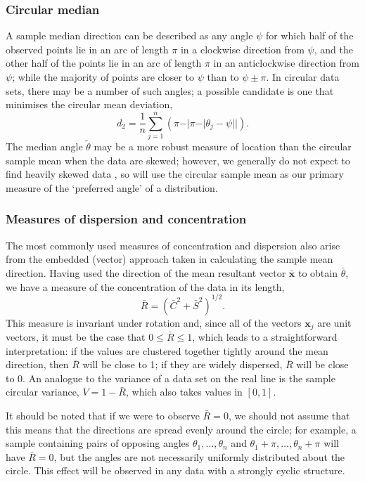 \documentclass[../../ArchStats.tex]{subfiles}
\begin{document}
\subsubsection{Circular median}

A sample median direction can be described as any angle $\psi$ for which half of the observed points lie in an arc of length $\pi$ in a clockwise direction from $\psi$, and the other half of the points lie in an arc of length $\pi$ in an anticlockwise direction from $\psi$; while the majority of points are closer to $\psi$ than to $\psi \pm \pi$.  In circular data sets, there may be a number of such angles; a possible candidate is one that minimises the circular mean deviation,
\[d_2 = \frac{1}{n} \sum_{j=1}^n \left( \pi - \vert \pi - \vert \theta_j - \psi \vert \vert \right).\]
The median angle $\tilde{\theta}$ may be a more robust measure of location than the circular sample mean when the data are skewed; however, we generally do not expect to find heavily skewed data , so will use the circular sample mean as our primary measure of the `preferred angle' of a distribution.


\subsubsection{Measures of dispersion and concentration}

The most commonly used measures of concentration and dispersion also arise from the embedded (vector) approach taken in calculating the sample mean direction. Having used the direction of the mean resultant vector $\mathbf{\bar{x}}$ to obtain $\bar{\theta}$, we have a measure of the concentration of the data in its length, 
\[\bar{R} = (\bar{C}^2 + \bar{S}^2)^{1/2}.\]
This measure is invariant under rotation and, since all of the vectors $\mathbf{x}_j$ are unit vectors, it must be the case that $0 \leq \bar{R} \leq 1$, which leads to a straightforward interpretation: if the values are clustered together tightly around the mean direction, then $\bar{R}$ will be close to 1; if they are widely dispersed, $\bar{R}$ will be close to 0. An analogue to the variance of a data set on the real line is the sample circular variance, $V = 1- \bar{R}$, which also takes values in $[0,1]$. 

It should be noted that if we were to observe $\bar{R} = 0$, we should not assume that this means that the directions are spread evenly around the circle; for example, a sample containing pairs of opposing angles $\theta_1, \dots, \theta_n$ and $\theta_1+\pi, \dots, \theta_n+\pi$ will have $\bar{R} = 0$, but the angles are not necessarily uniformly distributed about the circle. This effect will be observed in any data with a strongly cyclic structure.
\end{document}
